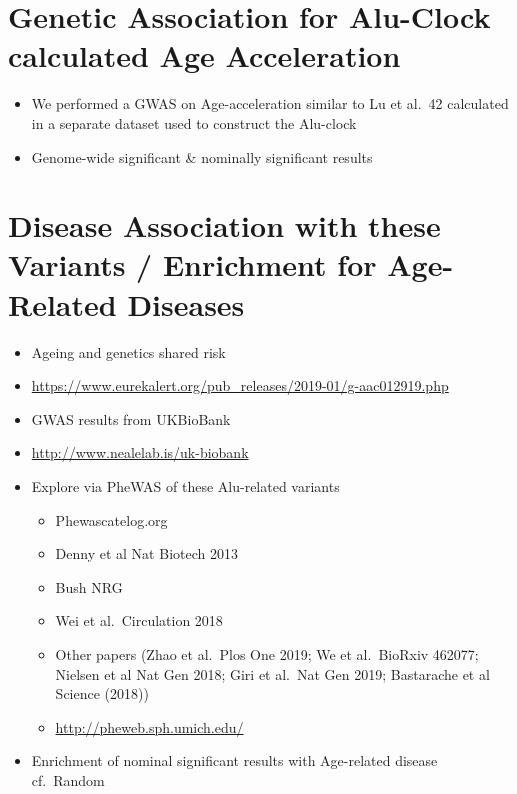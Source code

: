 \documentclass[]{book}
\providecommand{\tightlist}{%
  \setlength{\itemsep}{0pt}\setlength{\parskip}{0pt}}
\begin{document}
\hypertarget{genetic-association-for-alu-clock-calculated-age-acceleration}{%
\section{Genetic Association for Alu-Clock calculated Age Acceleration}\label{genetic-association-for-alu-clock-calculated-age-acceleration}}

\begin{itemize}
\tightlist
\item
  We performed a GWAS on Age-acceleration similar to Lu et al.~42 calculated in a separate dataset used to construct the Alu-clock
\item
  Genome-wide significant \& nominally significant results
\end{itemize}

\hypertarget{disease-association-with-these-variants-enrichment-for-age-related-diseases}{%
\section{Disease Association with these Variants / Enrichment for Age-Related Diseases}\label{disease-association-with-these-variants-enrichment-for-age-related-diseases}}

\begin{itemize}
\tightlist
\item
  Ageing and genetics shared risk \citep{Zenin2019}
\item
  \url{https://www.eurekalert.org/pub_releases/2019-01/g-aac012919.php}
\item
  GWAS results from UKBioBank
\item
  \url{http://www.nealelab.is/uk-biobank}
\item
  Explore via PheWAS of these Alu-related variants

  \begin{itemize}
  \tightlist
  \item
    Phewascatelog.org
  \item
    Denny et al Nat Biotech 2013 \citep{Denny2014}
  \item
    Bush NRG \citep{Bush2016}
  \item
    Wei et al.~Circulation 2018 \citep{Wei2018}
  \item
    Other papers (Zhao et al.~Plos One 2019; We et al.~BioRxiv 462077; Nielsen et al Nat Gen 2018; Giri et al.~Nat Gen 2019; Bastarache et al Science (2018))
  \item
    \url{http://pheweb.sph.umich.edu/}
  \end{itemize}
\item
  Enrichment of nominal significant results with Age-related disease cf.~Random
\end{itemize}
\end{document}
